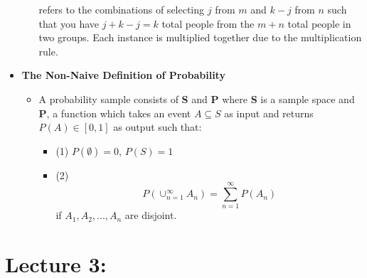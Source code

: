 \documentclass[11pt, oneside]{article}   	%
\begin{document}
\begin{itemize}
\begin{itemize}
			refers to the combinations of selecting $j$ from $m$ and $k-j$ from $n$ such that you have $j + k - j = k$ total people from the $m + n$ total people in two groups. Each instance is multiplied together due to the multiplication rule.
		\end{itemize}
		\item \textbf{The Non-Naive Definition of Probability}
			\begin{itemize}
				\item A probability sample consists of \textbf{S} and \textbf{P} where \textbf{S} is a sample space and \textbf{P}, a function which takes an event $A \subseteq S$ as input and returns $P(A) \in [0, 1]$ as output such that:
				\begin{itemize}
					\item (1) $P(\emptyset) = 0$, $P(S) = 1$
					\item (2) \[P( \cup_{n=1}^{\infty} A_{n} ) = \sum_{n=1}^{\infty} P(A_{n})\] if $A_1, A_2, ..., A_n$ are disjoint.
				\end{itemize}
			\end{itemize}
	\end{itemize}
\section{Lecture 3:}
\end{document}
